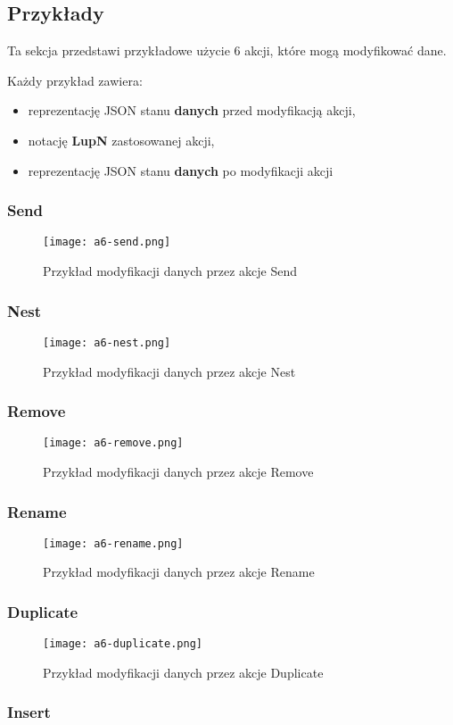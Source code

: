\subsection{Przykłady}

Ta sekcja przedstawi przykładowe użycie 6 akcji, które mogą modyfikować dane.

Każdy przykład zawiera:

\begin{itemize}
    \item reprezentację JSON stanu \textbf{danych} przed modyfikacją akcji,
    \item notację \textbf{LupN} zastosowanej akcji,
    \item reprezentację JSON stanu \textbf{danych} po modyfikacji akcji
\end{itemize}

\subsubsection{Send}
\begin{figure}[!h]
    \centering \texttt{[image: a6-send.png]}
    \caption{Przykład modyfikacji danych przez akcje Send}\label{fig:a6-send}
\end{figure}
\subsubsection{Nest}
\begin{figure}[!h]
    \centering \texttt{[image: a6-nest.png]}
    \caption{Przykład modyfikacji danych przez akcje Nest}\label{fig:a6-nest}
\end{figure}
\subsubsection{Remove}
\begin{figure}[!h]
    \centering \texttt{[image: a6-remove.png]}
    \caption{Przykład modyfikacji danych przez akcje Remove}\label{fig:a6-remove}
\end{figure}
\subsubsection{Rename}
\begin{figure}[!h]
    \centering \texttt{[image: a6-rename.png]}
    \caption{Przykład modyfikacji danych przez akcje Rename}\label{fig:a6-rename}
\end{figure}
\subsubsection{Duplicate}
\begin{figure}[!h]
    \centering \texttt{[image: a6-duplicate.png]}
    \caption{Przykład modyfikacji danych przez akcje Duplicate}\label{fig:a6-duplicate}
\end{figure}
\subsubsection{Insert}
